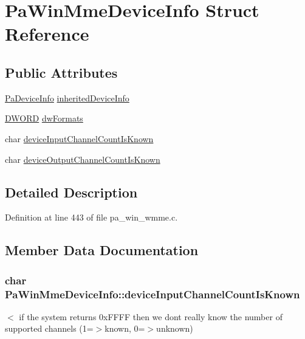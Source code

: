 \hypertarget{struct_pa_win_mme_device_info}{}\section{Pa\+Win\+Mme\+Device\+Info Struct Reference}
\label{struct_pa_win_mme_device_info}
\subsection*{Public Attributes}
\begin{DoxyCompactItemize}
\item 
\hyperlink{struct_pa_device_info}{Pa\+Device\+Info} \hyperlink{struct_pa_win_mme_device_info_a846b6b2dead7d75bf3abf3e087304745}{inherited\+Device\+Info}
\item 
\hyperlink{mapinls_8h_ad342ac907eb044443153a22f964bf0af}{D\+W\+O\+RD} \hyperlink{struct_pa_win_mme_device_info_a97ceb9b0ee1f0ea0f2207f58d373d197}{dw\+Formats}
\item 
char \hyperlink{struct_pa_win_mme_device_info_a08384a970a3a81f93242792b8540341e}{device\+Input\+Channel\+Count\+Is\+Known}
\item 
char \hyperlink{struct_pa_win_mme_device_info_aac6761abcaab988982f5a139e3af48b0}{device\+Output\+Channel\+Count\+Is\+Known}
\end{DoxyCompactItemize}


\subsection{Detailed Description}


Definition at line 443 of file pa\+\_\+win\+\_\+wmme.\+c.



\subsection{Member Data Documentation}
\subsubsection[{\texorpdfstring{device\+Input\+Channel\+Count\+Is\+Known}{deviceInputChannelCountIsKnown}}]{\setlength{\rightskip}{0pt plus 5cm}char Pa\+Win\+Mme\+Device\+Info\+::device\+Input\+Channel\+Count\+Is\+Known}\hypertarget{struct_pa_win_mme_device_info_a08384a970a3a81f93242792b8540341e}{}\label{struct_pa_win_mme_device_info_a08384a970a3a81f93242792b8540341e}
$<$ if the system returns 0x\+F\+F\+FF then we don\textquotesingle{}t really know the number of supported channels (1=$>$known, 0=$>$unknown) 

